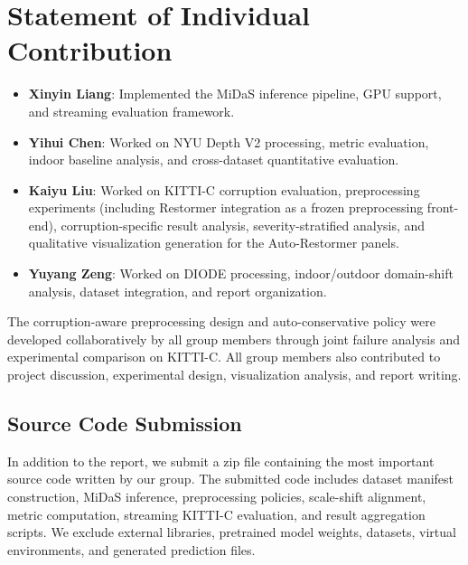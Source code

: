 \documentclass[10pt]{article}
\begin{document}
\section{Statement of Individual Contribution}

\begin{itemize}[leftmargin=*]
    \item \textbf{Xinyin Liang}: Implemented the MiDaS inference pipeline, GPU support, and streaming evaluation framework.
    
    \item \textbf{Yihui Chen}: Worked on NYU Depth V2 processing, metric evaluation, indoor baseline analysis, and cross-dataset quantitative evaluation.
    
    \item \textbf{Kaiyu Liu}: Worked on KITTI-C corruption evaluation, preprocessing experiments (including Restormer integration as a frozen preprocessing front-end), corruption-specific result analysis, severity-stratified analysis, and qualitative visualization generation for the Auto-Restormer panels.
    
    \item \textbf{Yuyang Zeng}: Worked on DIODE processing, indoor/outdoor domain-shift analysis, dataset integration, and report organization.
\end{itemize}

The corruption-aware preprocessing design and auto-conservative policy were developed collaboratively by all group members through joint failure analysis and experimental comparison on KITTI-C. All group members also contributed to project discussion, experimental design, visualization analysis, and report writing.

\subsection*{Source Code Submission}
In addition to the report, we submit a zip file containing the most important source code written by our group. The submitted code includes dataset manifest construction, MiDaS inference, preprocessing policies, scale-shift alignment, metric computation, streaming KITTI-C evaluation, and result aggregation scripts. We exclude external libraries, pretrained model weights, datasets, virtual environments, and generated prediction files.
\end{document}
